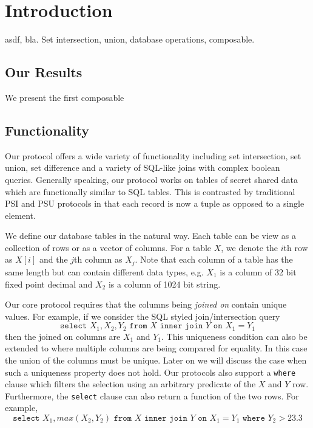 \section{Introduction}

asdf, bla. Set intersection, union, database operations, composable.







\subsection{Our Results}

We present the first composable



\subsection{Functionality}

Our protocol offers a wide variety of functionality including set intersection, set union, set difference and a variety of SQL-like joins with complex boolean queries. Generally speaking, our protocol works on tables of secret shared data which are functionally similar to SQL tables. This is contrasted by traditional PSI and PSU protocols in that each record is now a tuple as opposed to a single element. 

We define our database tables in the natural way. Each table can be view as a collection of rows or as a vector of columns. For a table $X$, we denote the $i$th row as $X[i]$ and the $j$th column as $X_j$. Note that each column of a table has the same length but can contain different data types, e.g. $X_1$ is a column of 32 bit fixed point decimal and $X_2$ is a column of 1024 bit string.

Our core protocol requires that the columns being \emph{joined on} contain unique values. For example, if we consider the SQL styled join/intersection query
$$
\texttt{select } X_1, X_2, Y_2 \texttt{ from } X \texttt{ inner join } Y \texttt{ on } X_1 = Y_1
$$
then the joined on columns are $X_1$ and $Y_1$. This uniqueness condition can also be extended to where multiple columns are being compared for equality. In this case the union of the columns must be unique. Later on we will discuss the case when such a uniqueness property does not hold. Our protocols also support a \texttt{where} clause which filters the selection using an arbitrary predicate of the $X$ and $Y$ row. Furthermore, the \texttt{select} clause can also return a function of the two rows. For example,
$$
\texttt{select } X_1,max(X_2, Y_2)  \texttt{ from } X \texttt{ inner join } Y \texttt{ on } X_1 = Y_1 \texttt{ where } Y_2 > 23.3
$$


